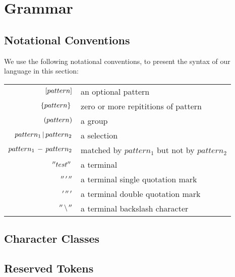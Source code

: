 \section{Grammar}

\subsection{Notational Conventions}
We use the following notational conventions, to present the
syntax of our language in this section:

\begin{center}
\begin{tabular}{r l}
  $[pattern]$ & an optional pattern \\
  $\,\{pattern\}\,$ & zero or more repititions of pattern \\
  $(pattern)$ & a group \\
  $pattern_1 \,|\, pattern_2$ & a selection \\
  $pattern_1 \, - \, pattern_2$ & matched by $pattern_1$ but not by $pattern_2$\\
  $\, '' test '' \,$ & a terminal \\
  $'' \, ' \, ''$ & a terminal single quotation mark \\
  $' \, '' \, '$ & a terminal double quotation mark \\
  $'' \, \backslash \, ''$ & a terminal backslash character \\
\end{tabular}
\end{center}

\subsection{Character Classes}
\begin{ebnf}
\end{ebnf}
\subsection{Reserved Tokens}
\begin{ebnf}
\end{ebnf}
